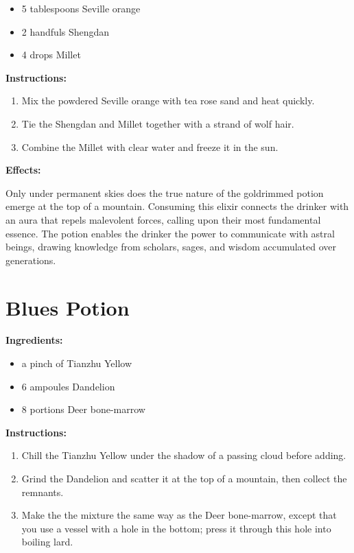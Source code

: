 \documentclass{article}
\begin{document}
\begin{itemize}
  \item 5 tablespoons Seville orange
  \item 2 handfuls Shengdan
  \item 4 drops Millet
\end{itemize}

\textbf{Instructions:}

\begin{enumerate}
  \item Mix the powdered Seville orange with tea rose sand and heat quickly.
  \item Tie the Shengdan and Millet together with a strand of wolf hair.
  \item Combine the Millet with clear water and freeze it in the sun.
\end{enumerate}

\textbf{Effects:}

Only under permanent skies does the true nature of the goldrimmed potion emerge at the top of a mountain. Consuming this elixir connects the drinker with an aura that repels malevolent forces, calling upon their most fundamental essence. The potion enables the drinker the power to communicate with astral beings, drawing knowledge from scholars, sages, and wisdom accumulated over generations.

\newpage
\section*{Blues Potion}

\textbf{Ingredients:}

\begin{itemize}
  \item a pinch of Tianzhu Yellow
  \item 6 ampoules Dandelion
  \item 8 portions Deer bone-marrow
\end{itemize}

\textbf{Instructions:}

\begin{enumerate}
  \item Chill the Tianzhu Yellow under the shadow of a passing cloud before adding.
  \item Grind the Dandelion and scatter it at the top of a mountain, then collect the remnants.
  \item Make the the mixture the same way as the Deer bone-marrow, except that you use a vessel with a hole in the bottom; press it through this hole into boiling lard.
\end{enumerate}
\end{document}

